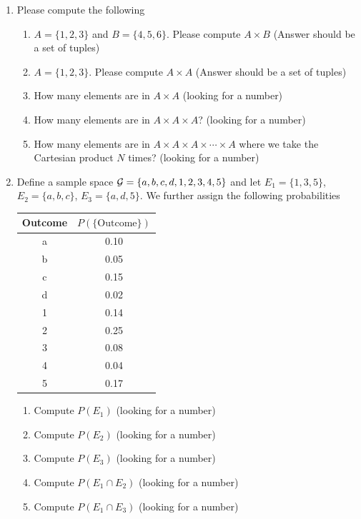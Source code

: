 \begin{enumerate}
   \item Please compute the following
   \begin{enumerate}
       \item $A = \{1,2,3\}$ and $B = \{4,5,6\}$. Please compute $A \times B$ (Answer should be a set of tuples)
       \item $A = \{1,2,3\}$. Please compute $A \times A$ (Answer should be a set of tuples)
       \item How many elements are in $A \times A$ (looking for a number)
       \item How many elements are in  $A \times A \times A$? (looking for a number)
       \item How many elements are in  $A \times A \times A \times \cdots \times A$ where we take the Cartesian product $N$ times? (looking for a number)
   \end{enumerate}
   \item Define a sample space $\mathcal{G} = \{ a,b,c,d,1,2,3,4,5 \}$ and let $E_{1} = \{1,3,5\}$, $E_{2} = \{a,b,c\}$, $E_{3} = \{ a,d,5 \}$. We further assign the following probabilities 
   \begin{table}[ht!]
       \centering
       \begin{tabular}{ c c}
       Outcome &  $P(\{\text{Outcome}\})$\\
       \hline
            a & 0.10  \\
            b & 0.05 \\
            c & 0.15 \\
            d & 0.02 \\
            1 & 0.14 \\
            2 & 0.25 \\
            3 & 0.08 \\
            4 & 0.04 \\
            5 & 0.17
       \end{tabular}
   \end{table}
   \begin{enumerate}
       \item Compute $P(E_{1})$ (looking for a number)
       \item Compute $P(E_{2})$ (looking for a number)
       \item Compute $P(E_{3})$ (looking for a number)
       \item Compute $P(E_{1} \cap E_{2})$ (looking for a number)
       \item Compute $P(E_{1} \cap E_{3})$ (looking for a number)

\end{enumerate}
\end{enumerate}
